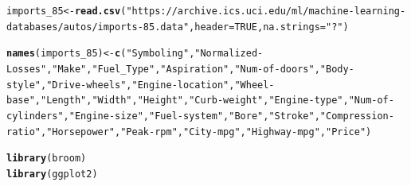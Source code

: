 \documentclass{article}\usepackage[]{graphicx}\usepackage[]{color}
\makeatletter
\newcommand{\hlnum}[1]{\textcolor[rgb]{0.686,0.059,0.569}{#1}}%
\newcommand{\hlstr}[1]{\textcolor[rgb]{0.192,0.494,0.8}{#1}}%
\newcommand{\hlstd}[1]{\textcolor[rgb]{0.345,0.345,0.345}{#1}}%
\newcommand{\hlkwb}[1]{\textcolor[rgb]{0.69,0.353,0.396}{#1}}%
\newcommand{\hlkwc}[1]{\textcolor[rgb]{0.333,0.667,0.333}{#1}}%
\newcommand{\hlkwd}[1]{\textcolor[rgb]{0.737,0.353,0.396}{\textbf{#1}}}%
\newenvironment{kframe}{%
 \def\at@end@of@kframe{}%
 \ifinner\ifhmode%
  \def\at@end@of@kframe{\end{minipage}}%
  \begin{minipage}{\columnwidth}%
 \fi\fi%
 \def\FrameCommand##1{\hskip\@totalleftmargin \hskip-\fboxsep
 \colorbox{shadecolor}{##1}\hskip-\fboxsep
     \hskip-\linewidth \hskip-\@totalleftmargin \hskip\columnwidth}%
 \MakeFramed {\advance\hsize-\width
   \@totalleftmargin\z@ \linewidth\hsize
   \@setminipage}}%
 {\par\unskip\endMakeFramed%
 \at@end@of@kframe}
\newenvironment{knitrout}{}{} %
\makeatother
\begin{document}
\begin{knitrout}
\color{fgcolor}\begin{kframe}
\begin{alltt}
\hlstd{imports_85} \hlkwb{<-} \hlkwd{read.csv}\hlstd{(}\hlstr{"https://archive.ics.uci.edu/ml/machine-learning-databases/autos/imports-85.data"}\hlstd{,} \hlkwc{header}\hlstd{=}\hlnum{TRUE}\hlstd{,} \hlkwc{na.strings}\hlstd{=}\hlstr{"?"}\hlstd{)}

\hlkwd{names}\hlstd{(imports_85)} \hlkwb{<-} \hlkwd{c}\hlstd{(}\hlstr{"Symboling"}\hlstd{,} \hlstr{"Normalized-Losses"}\hlstd{,}\hlstr{"Make"}\hlstd{,}\hlstr{"Fuel_Type"}\hlstd{,}\hlstr{"Aspiration"}\hlstd{,}\hlstr{"Num-of-doors"}\hlstd{,}\hlstr{"Body-style"}\hlstd{,}\hlstr{"Drive-wheels"}\hlstd{,}\hlstr{"Engine-location"}\hlstd{,}\hlstr{"Wheel-base"}\hlstd{,}\hlstr{"Length"}\hlstd{,}\hlstr{"Width"}\hlstd{,}\hlstr{"Height"}\hlstd{,}\hlstr{"Curb-weight"}\hlstd{,}\hlstr{"Engine-type"}\hlstd{,}\hlstr{"Num-of-cylinders"}\hlstd{,}\hlstr{"Engine-size"}\hlstd{,}\hlstr{"Fuel-system"}\hlstd{,}\hlstr{"Bore"}\hlstd{,}\hlstr{"Stroke"}\hlstd{,}\hlstr{"Compression-ratio"}\hlstd{,}\hlstr{"Horsepower"}\hlstd{,}\hlstr{"Peak-rpm"}\hlstd{,}\hlstr{"City-mpg"}\hlstd{,} \hlstr{"Highway-mpg"}\hlstd{,}\hlstr{"Price"}\hlstd{)}



\hlkwd{library}\hlstd{(broom)}
\hlkwd{library}\hlstd{(ggplot2)}


\end{alltt}
\end{kframe}
\end{knitrout}
\end{document}
